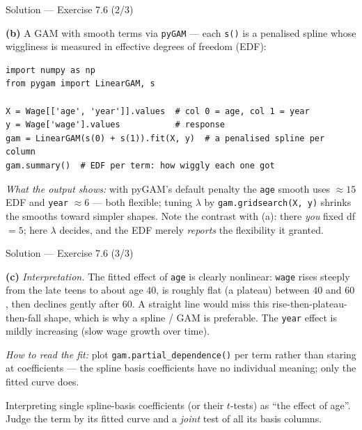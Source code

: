 \documentclass[aspectratio=169,11pt]{beamer}
\begin{document}
\begin{frame}[fragile]{Solution --- Exercise 7.6 (2/3)}
\begin{solutionbox}
\textbf{(b)} A GAM with smooth terms via \texttt{pyGAM} --- each \texttt{s()} is a penalised spline whose wiggliness is measured in effective degrees of freedom (EDF):
\begin{lstlisting}
import numpy as np
from pygam import LinearGAM, s

X = Wage[['age', 'year']].values  # col 0 = age, col 1 = year
y = Wage['wage'].values           # response
gam = LinearGAM(s(0) + s(1)).fit(X, y)  # a penalised spline per column
gam.summary()  # EDF per term: how wiggly each one got
\end{lstlisting}
\emph{What the output shows:} with pyGAM's default penalty the \texttt{age} smooth uses $\approx15$ EDF and \texttt{year} $\approx6$ --- both flexible; tuning $\lambda$ by \texttt{gam.gridsearch(X, y)} shrinks the smooths toward simpler shapes. Note the contrast with (a): there \emph{you} fixed df $=5$; here $\lambda$ decides, and the EDF merely \emph{reports} the flexibility it granted.
\end{solutionbox}
\end{frame}

\begin{frame}{Solution --- Exercise 7.6 (3/3)}
\begin{solutionbox}
\textbf{(c)} \textit{Interpretation.} The fitted effect of \texttt{age} is clearly nonlinear: \texttt{wage} rises steeply from the late teens to about age $40$, is roughly flat (a plateau) between $40$ and $60$, then declines gently after $60$. A straight line would miss this rise-then-plateau-then-fall shape, which is why a spline / GAM is preferable. The \texttt{year} effect is mildly increasing (slow wage growth over time).

\medskip
\emph{How to read the fit:} plot \texttt{gam.partial\_dependence()} per term rather than staring at coefficients --- the spline basis coefficients have no individual meaning; only the fitted curve does.
\end{solutionbox}
\begin{mistake}
Interpreting single spline-basis coefficients (or their $t$-tests) as ``the effect of age''. Judge the term by its fitted curve and a \emph{joint} test of all its basis columns.
\end{mistake}
\end{frame}
\end{document}
